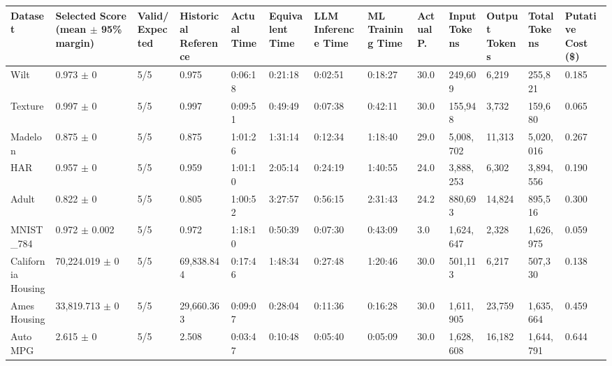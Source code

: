 \begin{tabular}{lllllllllllll}
\hline
Dataset & Selected Score (mean \ensuremath{\pm} 95\% margin) & Valid/Expected & Historical Reference & Actual Time & Equivalent Time & LLM Inference Time & ML Training Time & Actual P. & Input Tokens & Output Tokens & Total Tokens & Putative Cost (\$) \\
\hline
Wilt & 0.973 \ensuremath{\pm} 0 & 5/5 & 0.975 & 0:06:18 & 0:21:18 & 0:02:51 & 0:18:27 & 30.0 & 249,609 & 6,219 & 255,821 & 0.185 \\
Texture & 0.997 \ensuremath{\pm} 0 & 5/5 & 0.997 & 0:09:51 & 0:49:49 & 0:07:38 & 0:42:11 & 30.0 & 155,948 & 3,732 & 159,680 & 0.065 \\
Madelon & 0.875 \ensuremath{\pm} 0 & 5/5 & 0.875 & 1:01:26 & 1:31:14 & 0:12:34 & 1:18:40 & 29.0 & 5,008,702 & 11,313 & 5,020,016 & 0.267 \\
HAR & 0.957 \ensuremath{\pm} 0 & 5/5 & 0.959 & 1:01:10 & 2:05:14 & 0:24:19 & 1:40:55 & 24.0 & 3,888,253 & 6,302 & 3,894,556 & 0.190 \\
Adult & 0.822 \ensuremath{\pm} 0 & 5/5 & 0.805 & 1:00:52 & 3:27:57 & 0:56:15 & 2:31:43 & 24.2 & 880,693 & 14,824 & 895,516 & 0.300 \\
MNIST\_784 & 0.972 \ensuremath{\pm} 0.002 & 5/5 & 0.972 & 1:18:10 & 0:50:39 & 0:07:30 & 0:43:09 & 3.0 & 1,624,647 & 2,328 & 1,626,975 & 0.059 \\
California Housing & 70,224.019 \ensuremath{\pm} 0 & 5/5 & 69,838.844 & 0:17:46 & 1:48:34 & 0:27:48 & 1:20:46 & 30.0 & 501,113 & 6,217 & 507,330 & 0.138 \\
Ames Housing & 33,819.713 \ensuremath{\pm} 0 & 5/5 & 29,660.363 & 0:09:07 & 0:28:04 & 0:11:36 & 0:16:28 & 30.0 & 1,611,905 & 23,759 & 1,635,664 & 0.459 \\
Auto MPG & 2.615 \ensuremath{\pm} 0 & 5/5 & 2.508 & 0:03:47 & 0:10:48 & 0:05:40 & 0:05:09 & 30.0 & 1,628,608 & 16,182 & 1,644,791 & 0.644 \\
\hline
\end{tabular}

